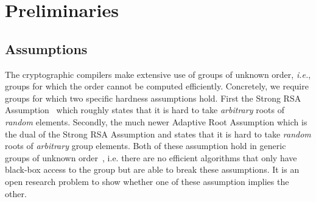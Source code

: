 \documentclass{article}
\theoremstyle{definition}
\begin{document}
\section{Preliminaries}

\subsection{Assumptions}

The cryptographic compilers make extensive use of groups of unknown order, \emph{i.e.}, groups for which the order cannot be computed efficiently.
Concretely, we require groups for which two specific hardness assumptions hold.
First the Strong RSA Assumption~\cite{CCS:CraSho99} which roughly states that it is hard to take \emph{arbitrary} roots of \emph{random} elements. Secondly, the much newer Adaptive Root Assumption\cite{EC:Wesolowski19} which is the dual of the Strong RSA Assumption and states that it is hard to take \emph{random} roots of \emph{arbitrary} group elements. 
Both of these assumption hold in generic groups of unknown order~\cite{genericunknown,C:BonBunFis19}, i.e. there are no efficient algorithms that only have black-box access to the group but are able to break these assumptions. 
It is an open research problem to show whether one of these assumption implies the other.
\end{document}
